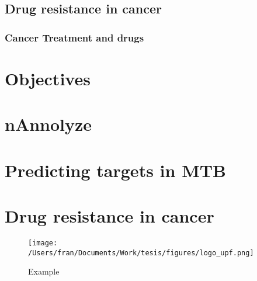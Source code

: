 \documentclass[12pt, a4paper,twoside]{tesi_upf}
\begin{document}
\section{Drug resistance in cancer}
\subsection{Cancer Treatment and drugs}





\chapter{Objectives}
\chapter{nAnnolyze}
\chapter{Predicting targets in MTB}
\chapter{Drug resistance in cancer}



\begin{figure}[b]
  \centering
  \texttt{[image: /Users/fran/Documents/Work/tesis/figures/logo\_upf.png]}
    \caption{Example}
    \label{fig:logo}
\end{figure}





%



\backmatter
\printindex

\printbibliography
\end{document}
